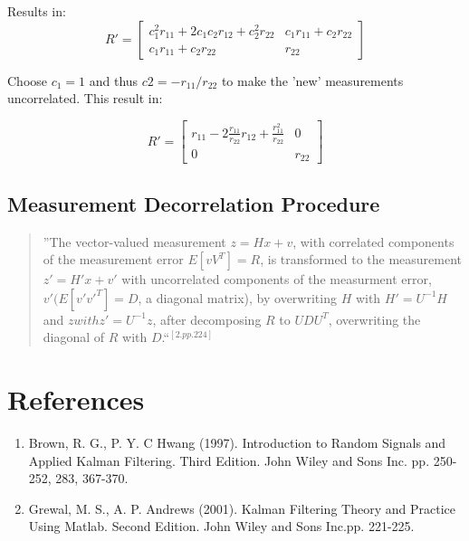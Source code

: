 \documentclass[letterpaper,11pt]{article}
\begin{document}
Results in: 
\begin{equation}
R' = 
\left[ 
\begin{array}{cc}
c_1^2 r_{11} + 2 c_1 c_2 r_{12} + c_2^2 r_{22}  & c_1 r_{11} + c_2 r_{22} \\
c_1 r_{11} + c_2 r_{22}                         & r_{22}
\end{array}
\right]
\end{equation}

Choose $c_1 = 1$ and thus $c2 = -r_{11} / r_{22}$ to make the 'new' measurements uncorrelated. This result in:

\begin{equation}
R' = 
\left[ 
\begin{array}{cc}
r_{11} - 2 \frac{r_{11}}{r_{22}}r_{12} + \frac{r_{11}^2}{r_{22}} & 0\\
0       &  r_{22}
\end{array}
\right]
\end{equation}

\subsection{Measurement Decorrelation Procedure}

\begin{quote}
''The vector-valued measurement $z = H x + v$, with correlated components of the measurement error $E[v V^T] = R$, is transformed to the measurement $z' = H' x + v'$ with uncorrelated components of the measurment error, $v' (E[v' v'^T] = D$, a diagonal matrix), by overwriting $H$ with $H' = U^{-1} H$ and $z with z' = U^{-1}z$, after decomposing $R$ to $U D U^T$, overwriting the diagonal of $R$ with $D$.``$^{[2. pp. 224]}$
\end{quote}


\section{References}
\begin{enumerate}
\item Brown, R. G., P. Y. C  Hwang (1997). Introduction to Random Signals and Applied Kalman Filtering. Third Edition. John Wiley and Sons Inc.  pp. 250-252, 283, 367-370. 
\item Grewal, M. S., A. P. Andrews (2001). Kalman Filtering Theory and Practice Using Matlab. Second Edition. John Wiley and Sons Inc.pp. 221-225.
\end{enumerate}
\end{document}
